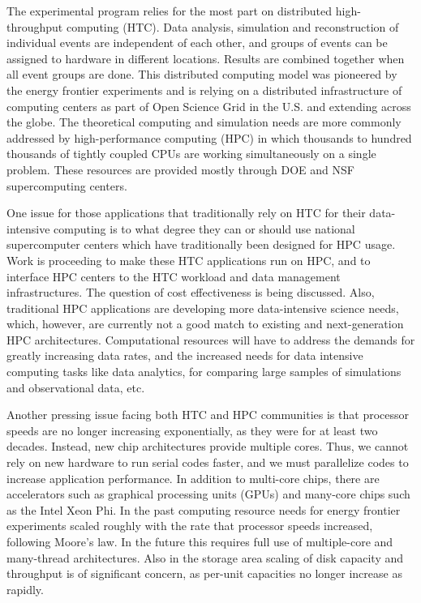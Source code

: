 The experimental program relies for the most part on distributed
high-throughput computing (HTC). Data analysis, simulation and
reconstruction of individual events are independent of each other, and
groups of events can be assigned to hardware in different locations.
Results are combined together when all event groups are done. This
distributed computing model was pioneered by the energy frontier
experiments and is relying on a distributed infrastructure of computing
centers as part of Open Science Grid in the U.S. and extending across the
globe. The theoretical computing and simulation needs are more commonly
addressed by high-performance computing (HPC) in which thousands to hundred
thousands of tightly coupled CPUs are working simultaneously on a single
problem. These resources are provided mostly through DOE and NSF
supercomputing centers.

One issue for those applications that traditionally rely on HTC for their
data-intensive computing is to what degree they can or should use national
supercomputer centers which have traditionally been designed for HPC usage.
Work is proceeding to make these HTC applications run on HPC, and to
interface HPC centers to the HTC workload and data management
infrastructures. The question of cost effectiveness is being discussed.
Also, traditional HPC applications are developing more data-intensive
science needs, which, however, are currently not a good match to existing
and next-generation HPC architectures. Computational resources will have to
address the demands for greatly increasing data rates, and the increased
needs for data intensive computing tasks like data analytics, for comparing
large samples of simulations and observational data, etc.

Another pressing issue facing both HTC and HPC communities is that
processor speeds are no longer increasing exponentially, as they were for
at least two decades. Instead, new chip architectures provide multiple
cores. Thus, we cannot rely on new hardware to run serial codes faster, and
we must parallelize codes to increase application performance. In addition
to multi-core chips, there are accelerators such as graphical processing
units (GPUs) and many-core chips such as the Intel Xeon Phi. 
In the past computing resource needs for energy frontier experiments scaled
roughly with the rate that processor speeds increased, following Moore's
law. In the future this requires full use of multiple-core and many-thread 
architectures. Also
in the storage area scaling of disk capacity and throughput is of
significant concern, as per-unit capacities no longer increase as rapidly.

